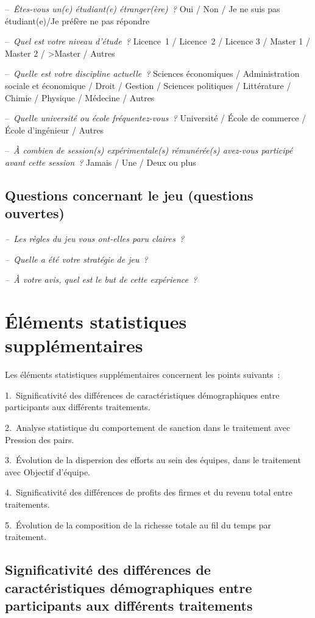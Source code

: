 \begin{Article}
\begin{refsection}[Lebourges]
\begin{appendices}
--~\emph{Êtes-vous un(e) étudiant(e) étranger(ère)~?} Oui / Non / Je ne suis
pas étudiant(e)/Je préfère ne pas répondre

--~\emph{Quel est votre niveau d'étude~?} Licence~1 / Licence~2 /
Licence 3 / Master 1 / Master 2 / \textgreater Master / Autres

--~\emph{Quelle est votre discipline actuelle~?} Sciences économiques /
Administration sociale et économique / Droit / Gestion / Sciences
politiques / Littérature / Chimie / Physique / Médecine / Autres

--~\emph{Quelle université ou école fréquentez-vous~?} Université /
École de commerce / École d'ingénieur / Autres

--~\emph{À combien de session(s) expérimentale(s) rémunérée(s) avez-vous
participé avant cette session~?} Jamais / Une / Deux ou plus


\subsection{Questions concernant le jeu (questions ouvertes)}

\emph{--~Les règles du jeu vous ont-elles paru claires~?}

\emph{--~Quelle a été votre stratégie de jeu~?}

\emph{--~À votre avis, quel est le but de cette expérience~?}

\section{Éléments statistiques supplémentaires}
\label{Annexe:Éléments stats}

Les éléments statistiques supplémentaires concernent les points
suivants~:

1.~Significativité des différences de caractéristiques démographiques
entre participants aux différents traitements.

2.~Analyse statistique du comportement de sanction dans le traitement
avec Pression des pairs.

3.~Évolution de la dispersion des efforts au sein des équipes, dans le
traitement avec Objectif d'équipe.

4.~Significativité des différences de profits des firmes et du revenu
total entre traitements.

5.~Évolution de la composition de la richesse totale au fil du temps par
traitement.


\subsection{Significativité des différences de caractéristiques
démographiques entre participants aux différents traitements}
\label{Annexe:Significativité différences}


\end{appendices}
\end{refsection}
\end{Article}
